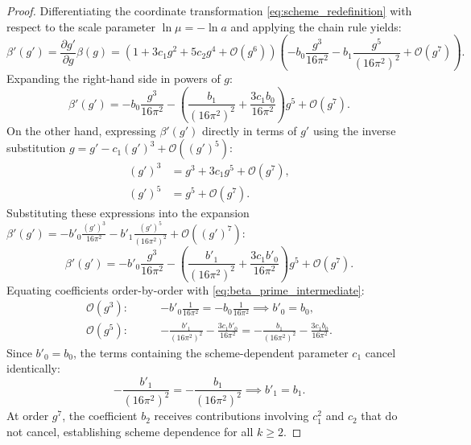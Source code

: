 \begin{proof}
Differentiating the coordinate transformation \eqref{eq:scheme_redefinition} with respect to the scale parameter $\ln \mu = -\ln a$ and applying the chain rule yields:
\begin{equation}
\beta'(g') = \frac{\partial g'}{\partial g} \beta(g) = \left( 1 + 3 c_1 g^2 + 5 c_2 g^4 + \mathcal{O}(g^6) \right) \left( -b_0 \frac{g^3}{16\pi^2} - b_1 \frac{g^5}{(16\pi^2)^2} + \mathcal{O}(g^7) \right).
\end{equation}
Expanding the right-hand side in powers of $g$:
\begin{equation}
\label{eq:beta_prime_intermediate}
\beta'(g') = -b_0 \frac{g^3}{16\pi^2} - \left( \frac{b_1}{(16\pi^2)^2} + \frac{3 c_1 b_0}{16\pi^2} \right) g^5 + \mathcal{O}(g^7).
\end{equation}
On the other hand, expressing $\beta'(g')$ directly in terms of $g'$ using the inverse substitution $g = g' - c_1 (g')^3 + \mathcal{O}((g')^5)$:
\begin{align}
(g')^3 &= g^3 + 3 c_1 g^5 + \mathcal{O}(g^7), \nonumber \\
(g')^5 &= g^5 + \mathcal{O}(g^7).
\end{align}
Substituting these expressions into the expansion $\beta'(g') = -b'_0 \frac{(g')^3}{16\pi^2} - b'_1 \frac{(g')^5}{(16\pi^2)^2} + \mathcal{O}((g')^7)$:
\begin{equation}
\beta'(g') = -b'_0 \frac{g^3}{16\pi^2} - \left( \frac{b'_1}{(16\pi^2)^2} + \frac{3 c_1 b'_0}{16\pi^2} \right) g^5 + \mathcal{O}(g^7).
\end{equation}
Equating coefficients order-by-order with \eqref{eq:beta_prime_intermediate}:
\begin{align}
\mathcal{O}(g^3): \qquad & -b'_0 \frac{1}{16\pi^2} = -b_0 \frac{1}{16\pi^2} \implies b'_0 = b_0, \\
\mathcal{O}(g^5): \qquad & -\frac{b'_1}{(16\pi^2)^2} - \frac{3 c_1 b'_0}{16\pi^2} = -\frac{b_1}{(16\pi^2)^2} - \frac{3 c_1 b_0}{16\pi^2}.
\end{align}
Since $b'_0 = b_0$, the terms containing the scheme-dependent parameter $c_1$ cancel identically:
\begin{equation}
-\frac{b'_1}{(16\pi^2)^2} = -\frac{b_1}{(16\pi^2)^2} \implies b'_1 = b_1.
\end{equation}
At order $g^7$, the coefficient $b_2$ receives contributions involving $c_1^2$ and $c_2$ that do not cancel, establishing scheme dependence for all $k \ge 2$.
\end{proof}

